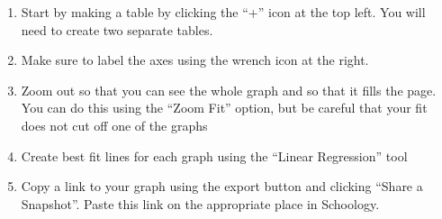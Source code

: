 \documentclass[10pt]{exam}
\begin{document}
\begin{multicols}{2}

  \begin{enumerate}[label=\alph*),topsep=0pt,itemsep=-1ex,partopsep=1ex,parsep=1ex]
    \item \label{table} Start by making a table by clicking the “+” icon at the top left.  You will need to create two separate tables.
    \item \label{wrench} Make sure to label the axes using the wrench icon at the right.
    \item \label{zoom} Zoom out so that you can see the whole graph and so that it fills the page.  You can do this using the ``Zoom Fit'' option, but be careful that your fit does not cut off one of the graphs
    \item \label{linear} Create best fit lines for each graph using the ``Linear Regression'' tool
    \item Copy a link to your graph using the export button and clicking ``Share a Snapshot''.  Paste this link on the appropriate place in Schoology.
  \end{enumerate}

\end{multicols}
\end{document}
